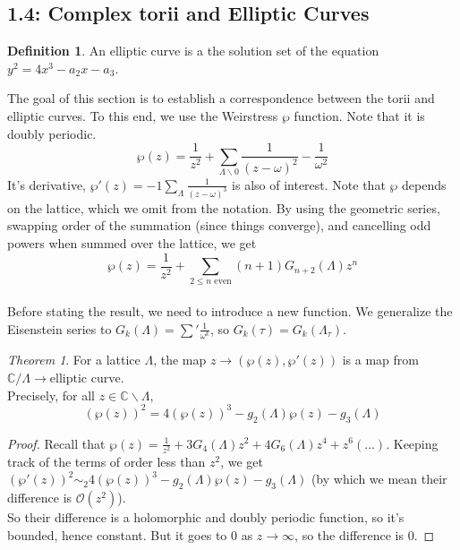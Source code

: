 \documentclass[11pt]{article}
\theoremstyle{plain}
\theoremstyle{definition}
\newtheorem{definition}{Definition}[section]
\theoremstyle{example}
\theoremstyle{remark}
\theoremstyle{lemma}
\theoremstyle{proposition}
\theoremstyle{Problem}
\theoremstyle{Solution}
\theoremstyle{theorem}
\newtheorem{theorem}{Theorem}[section]
\theoremstyle{corollary}
\begin{document}
\subsection{1.4: Complex torii and Elliptic Curves}
\begin{definition}
An elliptic curve is a the solution set of the equation $y^2 = 4x^3-a_2x-a_3$.
\end{definition}
The goal of this section is to establish a correspondence between the torii and elliptic curves. To this end, we use the Weirstress $\wp$ function. Note that it is doubly periodic.
$$\wp(z) = \frac{1}{z^2} +\sum_{\Lambda\backslash 0} \frac{1}{(z-\omega)^2}-\frac{1}{\omega^2}$$
It's derivative, $\wp'(z) = -1\sum_\Lambda \frac{1}{(z-\omega)^3}$ is also of interest. Note that $\wp$ depends on the lattice, which we omit from the notation. By using the geometric series, swapping order of the summation (since things converge), and cancelling odd powers when summed over the lattice, we get 
$$\wp(z) = \frac{1}{z^2} + \sum_{2\leq n \text{ even}} (n+1)G_{n+2}(\Lambda)z^n$$\\ 
Before stating the result, we need to introduce a new function. We generalize the Eisenstein series to $G_k(\Lambda) = \sum' \frac{1}{\omega^k}$, so $G_k(\tau) = G_k(\Lambda_\tau)$.\\
\begin{theorem} 
For a lattice $\Lambda$, the map $z\to(\wp(z), \wp'(z))$ is a map from $\mathbb{C}/\Lambda \to \text{elliptic curve}$. \\
Precisely, for all $z\in \mathbb{C}\backslash \Lambda$,
$$(\wp(z))^2 = 4(\wp(z))^3 - g_2(\Lambda)\wp(z) - g_3(\Lambda)$$
\end{theorem}
\begin{proof}
Recall that $\wp(z) = \frac{1}{z^2} + 3G_4(\Lambda)z^2 + 4G_6(\Lambda)z^4 + z^6(...)$. Keeping track of the terms of order less than $z^2$, we get $(\wp'(z))^2 \sim_2 4(\wp(z))^3-g_2(\Lambda)\wp(z) - g_3(\Lambda)$ (by which we mean their difference is $\mathcal{O}(z^2)$).\\
So their difference is a holomorphic and doubly periodic function, so it's bounded, hence constant. But it goes to $0$ as $z\to\infty$, so the difference is $0$.
\end{proof}
\end{document}
